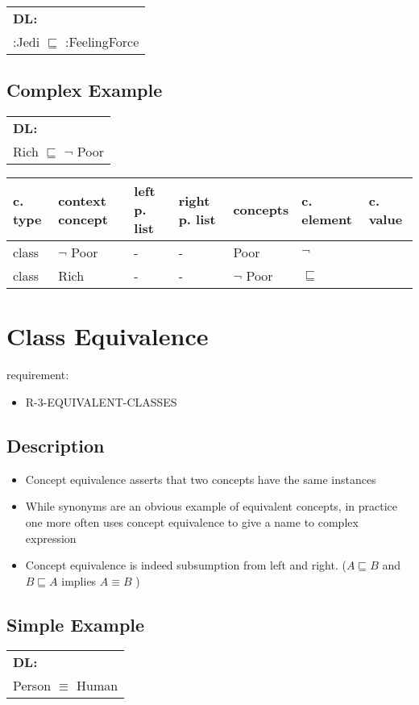 \documentclass{llncs}
\newenvironment{gcotable}{
  \scriptsize
  \sffamily
  \vspace{0.3cm}
  \begin{tabular}{l|l|l|l|l|l|l}
  \hline
  \textbf{c. type} & \textbf{context concept} & \textbf{left p. list} & \textbf{right p. list} & \textbf{concepts} & \textbf{c. element} & \textbf{c. value} \\
  \hline

}{
  \hline
  \end{tabular}
  \linebreak
}
\newenvironment{DL}{
  \scriptsize
  \sffamily
  \vspace{0.3cm}
  \begin{tabular}{l}
	\textbf{DL:} \\

}{
  \end{tabular}
  \linebreak
}
\begin{document}
\begin{DL}
:Jedi $\sqsubseteq$ :FeelingForce
\end{DL}

\subsection{Complex Example}

\begin{DL}
Rich $\sqsubseteq$ $\neg$ Poor 
\end{DL}

\begin{gcotable}
class & $\neg$ Poor & - & - & Poor & $\neg$ \\
class & Rich & - & - & $\neg$ Poor & $\sqsubseteq$ \\
\end{gcotable}

\section{Class Equivalence}

requirement:

\begin{itemize}
	\item R-3-EQUIVALENT-CLASSES
\end{itemize}

\subsection{Description}

\begin{itemize}
	\item Concept equivalence asserts that two concepts have the same instances \cite{Kroetzsch2012}
  \item While synonyms are an obvious example of equivalent concepts, in practice one more
often uses concept equivalence to give a name to complex expression  \cite{Kroetzsch2012}
\item Concept equivalence is indeed subsumption  from left and right. ($A \sqsubseteq B$ and $B \sqsubseteq A$ implies $A \equiv B$ )

\end{itemize}

\subsection{Simple Example}

\begin{DL}
Person $\equiv$ Human
\end{DL}
\end{document}
